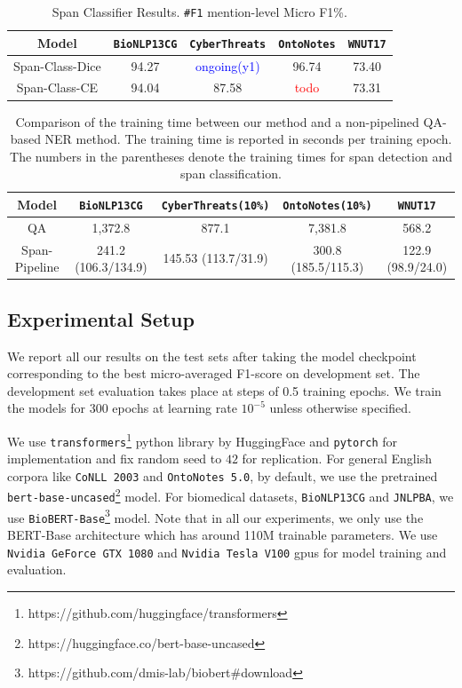 \begin{table}[h!]
\centering
\begin{small}
\begin{tabular}{ccccc}\toprule
 \textbf{Model} & \texttt{BioNLP13CG} & \texttt{CyberThreats} & \texttt{OntoNotes} & \texttt{WNUT17} \\ \toprule 
Span-Class-Dice & 94.27 & \textcolor{blue}{ongoing(y1)} &  96.74 & 73.40  \\
Span-Class-CE     & 94.04 & 87.58 & \textcolor{red}{todo} & 73.31  \\
\bottomrule
\end{tabular}
\caption{Span Classifier Results. \texttt{\#F1} mention-level Micro F1\%.}
\label{tab:class_ablation}
\end{small}
\end{table}

\begin{table}[h!]
\centering
\begin{small}
\begin{tabular}{ccccc}\toprule
 \textbf{Model} & \texttt{BioNLP13CG} & \texttt{CyberThreats(10\%)} & \texttt{OntoNotes(10\%)} & \texttt{WNUT17} \\ \toprule 
QA                & 1,372.8 & 877.1 &  7,381.8   & 568.2\\
Span-Pipeline     & 241.2 (106.3/134.9) & 145.53 (113.7/31.9) & 300.8 (185.5/115.3)  & 122.9 (98.9/24.0)\\
\bottomrule
\end{tabular}
\caption{Comparison of the training time between our method and a non-pipelined QA-based NER method. 
    The training time is reported in seconds per training epoch. The numbers in the parentheses denote the training times for span detection and span classification. }
\label{tab:train_time_ablation}
\end{small}
\end{table}

\subsection{Experimental Setup}
We report all our results on the test sets after taking the model checkpoint corresponding to the best micro-averaged F1-score on development set. The development set evaluation takes place at steps of 0.5 training epochs. We train the models for $300$ epochs at learning rate $10^{-5}$ unless otherwise specified.

We use \texttt{transformers}\footnote{https://github.com/huggingface/transformers} python library by HuggingFace and \texttt{pytorch} for implementation and fix random seed to $42$ for replication. For general English corpora like \texttt{CoNLL 2003} and \texttt{OntoNotes 5.0}, by default, we use the pretrained \texttt{bert-base-uncased}\footnote{https://huggingface.co/bert-base-uncased} model. For biomedical datasets, \texttt{BioNLP13CG} and \texttt{JNLPBA}, we use \texttt{BioBERT-Base}\footnote{https://github.com/dmis-lab/biobert\#download} model. Note that in all our experiments, we only use the BERT-Base architecture which has around 110M trainable parameters. We use \texttt{Nvidia GeForce GTX 1080} and \texttt{Nvidia Tesla V100} gpus for model training and evaluation.

